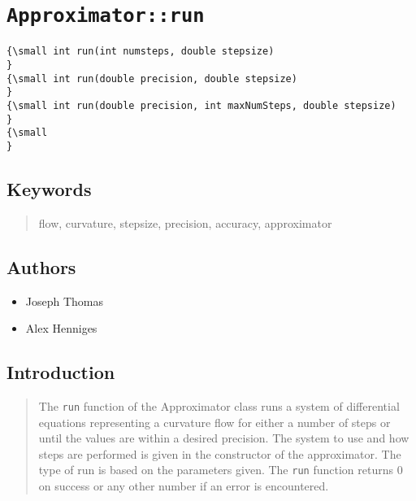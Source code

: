                       


\section*{\texttt{Approximator::run}}

\label{f0}

\begin{quotation}
{\small }
\end{quotation}

\begin{verbatim}
{\small int run(int numsteps, double stepsize)        
}
{\small int run(double precision, double stepsize)
}
{\small int run(double precision, int maxNumSteps, double stepsize)
}
{\small   
}
\end{verbatim}

\subsection*{Keywords}

\begin{quotation}
flow, curvature, stepsize, precision, accuracy, approximator
\end{quotation}

\subsection*{Authors}

\begin{itemize}
\item Joseph Thomas

\item Alex Henniges
\end{itemize}

\subsection*{Introduction}

\begin{quotation}
The \texttt{run} function of the Approximator class runs a system of
differential equations representing a curvature flow for either a number of
steps or until the values are within a desired precision. The system to use
and how steps are performed is given in the constructor of the approximator.
The type of run is based on the parameters given. The \texttt{run} function
returns 0 on success or any other number if an error is encountered.
\end{quotation}

